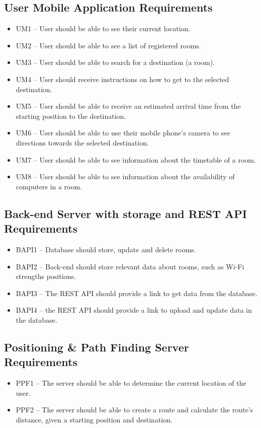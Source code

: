 \subsection{User Mobile Application Requirements}
\label{sec:user-mobilde-requirements}
\begin{itemize}
    \item UM1 – User should be able to see their current location.
    \item UM2 – User should be able to see a list of registered rooms.
    \item UM3 – User should be able to search for a destination (a room).
    \item UM4 – User should receive instructions on how to get to the selected destination.
    \item UM5 – User should be able to receive an estimated arrival time from the starting position to the destination.
    \item UM6 – User should be able to use their mobile phone's camera to see directions towards the selected destination.
    \item UM7 – User should be able to see information about the timetable of a room.
    \item UM8 – User should be able to see information about the availability of computers in a room.
\end{itemize}

\subsection{Back-end Server with storage and REST API Requirements}
\label{sec:server-api}
\begin{itemize}
    \item BAPI1 – Database should store, update and delete rooms.
    \item BAPI2 – Back-end should store relevant data about rooms, such as Wi-Fi strengths positions.
    \item BAPI3 – The REST API should provide a link to get data from the database.
    \item BAPI4 – the REST API should provide a link to upload and update data in the database.
\end{itemize}

\subsection{Positioning \& Path Finding Server Requirements}
\label{sec:navigation-server}
\begin{itemize}
    \item PPF1 – The server should be able to determine the current location of the user.
    \item PPF2 – The server should be able to create a route and calculate the route's distance, given a starting position and destination.
\end{itemize}

